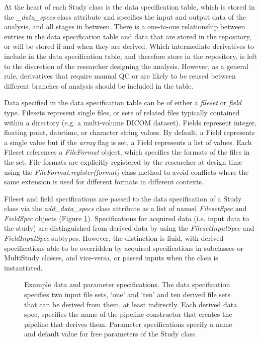 \documentclass[smallextended]{svjour3}       %
\begin{document}
At the heart of each Study class is the data specification table, which
is stored in the \emph{\_data\_specs} class attribute and specifies the
input and output data of the analysis, and all
stages in between. There is a one-to-one relationship between entries in
the data specification table and data that are stored in the repository,
or will be stored if and when they are derived. Which intermediate
derivatives to include in the data specification table, and therefore
store in the repository, is left to the discretion of the researcher
designing the analysis. However, as a general rule, derivatives that
require manual QC or are likely to be reused between different branches
of analysis should be included in the table.

Data specified in the data specification table can be of either a
\emph{fileset} or \emph{field} type. Filesets represent single files,
or sets of related files typically contained within a directory
(e.g. a multi-volume DICOM dataset). Fields
represent integer, floating point, datetime, or character string
values. By default, a Field represents a single value but if the \emph{array}
flag is set, a Field represents a list of values.
Each Fileset references a \emph{FileFormat} object, which
specifies the formats of the files in the set. File formats are
explicitly registered by the researcher at design time using the
\emph{FileFormat.register(format)} class method to avoid conflicts where
the same extension is used for different formats in different contexts.

Fileset and field specifications are passed to the data specification of
a Study class via the \emph{add\_data\_specs} class attribute as a list
of named \emph{FilesetSpec} and \emph{FieldSpec} objects (Figure \ref{fig:data_spec}).
Specifications for acquired data (i.e. input data to the study) are
distinguished from derived data by using the \emph{FilesetInputSpec}
and \emph{FieldInputSpec} subtypes. However, the distinction is
fluid, with derived specifications able to be overridden by acquired
specifications in subclasses or MultiStudy classes, and vice-versa, or
passed inputs when the class is instantiated.

\begin{figure}

\caption{Example data and parameter specifications. The data
specification specifies two input file sets, `one' and `ten' and
ten derived file sets that can be derived from them, at least
indirectly. Each derived data spec, specifies the name of the pipeline
constructor that creates the pipeline that derives them. Parameter
specifications specify a name and default value for free parameters of
the Study class}
\label{fig:data_spec}
\end{figure}
\end{document}
